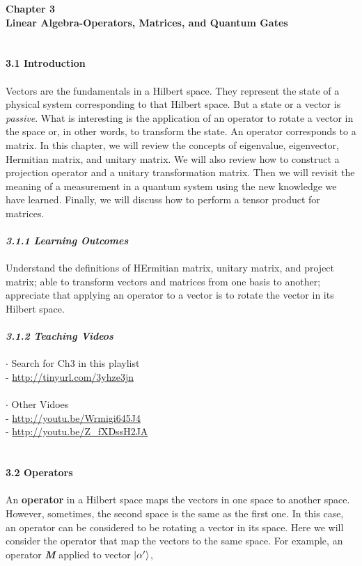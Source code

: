 \documentclass{article}
\begin{document}
\textbf{\Large Chapter 3} \\ 
\textbf{\Large Linear Algebra-Operators, Matrices, and Quantum Gates}
\\
\\
\\
\textbf{\large 3.1 Introduction}
\\
\\
Vectors are the fundamentals in a Hilbert space. They represent the state of a physical system corresponding to that
Hilbert space. But a state or a vector is \textit{passive}. What is interesting is the application of an operator to rotate
a vector  in the space or, in other words, to transform the state. An operator corresponds to a matrix.
In this chapter, we will review the concepts of eigenvalue, eigenvector, Hermitian matrix, and unitary matrix.
We will also review how to construct a projection operator and a unitary transformation matrix.
Then we will revisit the meaning of a measurement in a quantum system using the new knowledge we have learned. Finally,
we will discuss how to perform a tensor product for matrices.
\\
\\
\textbf{\textit{3.1.1 Learning Outcomes}}
\\
\\
Understand the definitions of HErmitian matrix, unitary matrix, and project matrix;
able to transform vectors and matrices from one basis to another; appreciate
that applying an operator to a vector is to rotate the vector in its Hilbert space.
\\
\\
\textbf{\textit{3.1.2 Teaching Videos}}
\\
\\
$\cdot$ Search for Ch3 in this playlist\\
- \url{http://tinyurl.com/3yhze3jn}\\
\\
$\cdot$ Other Vidoes\\
- \url{http://youtu.be/Wrmigi645J4}\\
- \url{http://youtu.be/Z_fXDssH2JA}\\
\\
\\
\textbf{\large 3.2 Operators}
\\
\\
An \textbf{operator} in a Hilbert space maps the vectors in one space to another space.
However, sometimes, the second space is the same as the first one. In this case,
an operator can be considered to be rotating a vector in its space. Here we will consider
the operator that map the vectors to the same space. For example, an operator \textbf{\textit{M}} 
applied to vector $\ket{\alpha^\prime}$,
\end{document}
